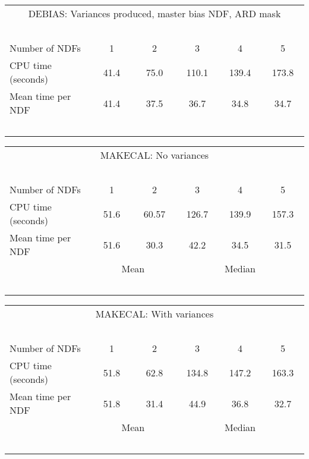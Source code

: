 \begin{center}
   \begin{tabular}{|l||c|c|c|c|c|}
   \multicolumn{6}{c}{DEBIAS: Variances produced, master bias NDF,
   ARD mask} \\
   \multicolumn{6}{l}{~~~}
   \\ \hline
   Number of NDFs    & ~~~1~~~ & ~~~2~~~ & ~~~3~~~ & ~~~4~~~ & ~~~5~~~
    \\ \hline
   CPU time (seconds)&  41.4   & 75.0    & 110.1    & 139.4    & 173.8
    \\ \hline
   Mean time per NDF & 41.4    & 37.5    & 36.7    &  34.8     & 34.7
    \\ \hline
   \multicolumn{6}{l}{~~~}
   \\
   \end{tabular}
\end{center}

\begin{center}
   \begin{tabular}{|l||c|c|c|c|c|}
   \multicolumn{6}{c}{MAKECAL: No variances} \\
   \multicolumn{6}{l}{~~~}
   \\ \hline
   Number of NDFs    & ~~~1~~~ & ~~~2~~~ & ~~~3~~~ & ~~~4~~~ & ~~~5~~~
    \\ \hline
   CPU time (seconds)&  51.6   & 60.57   & 126.7   & 139.9   & 157.3
    \\ \hline
   Mean time per NDF & 51.6    & 30.3    & 42.2    &  34.5     & 31.5
    \\ \hline
   \multicolumn{1}{c}{~~~}
   & \multicolumn{2}{c|}{Mean}
   & \multicolumn{3}{c}{Median}
   \\
   \multicolumn{6}{l}{~~~}
   \\
   \end{tabular}
   \begin{tabular}{|l||c|c|c|c|c|}
   \multicolumn{6}{c}{MAKECAL: With variances} \\
   \multicolumn{6}{l}{~~~}
   \\ \hline
   Number of NDFs    & ~~~1~~~ & ~~~2~~~ & ~~~3~~~ & ~~~4~~~ & ~~~5~~~
    \\ \hline
   CPU time (seconds)&  51.8   & 62.8   & 134.8   & 147.2   & 163.3
    \\ \hline
   Mean time per NDF & 51.8    & 31.4    & 44.9    &  36.8     & 32.7
    \\ \hline
   \multicolumn{1}{c}{~~~}
   & \multicolumn{2}{c|}{Mean}
   & \multicolumn{3}{c}{Median}
   \\
   \multicolumn{6}{l}{~~~}
   \\
   \end{tabular}
\end{center}

